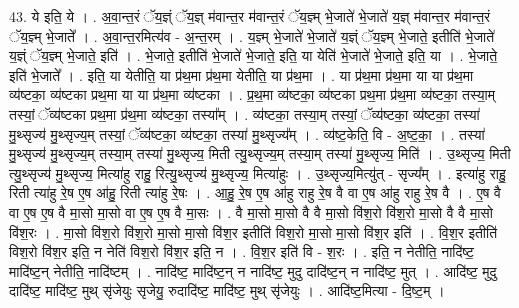 \documentclass[17pt]{extarticle}
\begin{document}
43. ये इति॒ ये । . अ॒वा॒न्त॒रं ॅय॒ज्ञ्ं ॅय॒ज्ञ् म॑वान्त॒र म॑वान्त॒रं ॅय॒ज्ञ्म् भे॒जाते॑ भे॒जाते॑ य॒ज्ञ् म॑वान्त॒र म॑वान्त॒रं ॅय॒ज्ञ्म् भे॒जाते᳚ । . अ॒वा॒न्त॒रमित्य॑व - अ॒न्त॒रम् । . य॒ज्ञ्म् भे॒जाते॑ भे॒जाते॑ य॒ज्ञ्ं ॅय॒ज्ञ्म् भे॒जाते॒ इतीति॑ भे॒जाते॑ य॒ज्ञ्ं ॅय॒ज्ञ्म् भे॒जाते॒ इति॑ । . भे॒जाते॒ इतीति॑ भे॒जाते॑ भे॒जाते॒ इति॒ या येति॑ भे॒जाते॑ भे॒जाते॒ इति॒ या । . भे॒जाते॒ इति॑ भे॒जाते᳚ । . इति॒ या येतीति॒ या प्र॑थ॒मा प्र॑थ॒मा येतीति॒ या प्र॑थ॒मा । . या प्र॑थ॒मा प्र॑थ॒मा या या प्र॑थ॒मा व्य॑ष्टका॒ व्य॑ष्टका प्रथ॒मा या या प्र॑थ॒मा व्य॑ष्टका । . प्र॒थ॒मा व्य॑ष्टका॒ व्य॑ष्टका प्रथ॒मा प्र॑थ॒मा व्य॑ष्टका॒ तस्या॒म् तस्यां॒ ॅव्य॑ष्टका प्रथ॒मा प्र॑थ॒मा व्य॑ष्टका॒ तस्या᳚म् । . व्य॑ष्टका॒ तस्या॒म् तस्यां॒ ॅव्य॑ष्टका॒ व्य॑ष्टका॒ तस्या॑ मु॒थ्सृज्य॑ मु॒थ्सृज्य॒म् तस्यां॒ ॅव्य॑ष्टका॒ व्य॑ष्टका॒ तस्या॑ मु॒थ्सृज्य᳚म् । . व्य॑ष्ट॒केति॒ वि - अ॒ष्ट॒का॒ । . तस्या॑ मु॒थ्सृज्य॑ मु॒थ्सृज्य॒म् तस्या॒म् तस्या॑ मु॒थ्सृज्य॒ मिती त्यु॒थ्सृज्य॒म् तस्या॒म् तस्या॑ मु॒थ्सृज्य॒ मिति॑ । . उ॒थ्सृज्य॒ मिती त्यु॒थ्सृज्य॑ मु॒थ्सृज्य॒ मित्या॑हु राहु॒ रित्यु॒थ्सृज्य॑ मु॒थ्सृज्य॒ मित्या॑हुः । . उ॒थ्सृज्य॒मित्यु॑त् - सृज्य᳚म् । . इत्या॑हु राहु॒ रिती त्या॑हु रे॒ष ए॒ष आ॑हु॒ रिती त्या॑हु रे॒षः । . आ॒हु॒ रे॒ष ए॒ष आ॑हु राहु रे॒ष वै वा ए॒ष आ॑हु राहु रे॒ष वै । . ए॒ष वै वा ए॒ष ए॒ष वै मा॒सो मा॒सो वा ए॒ष ए॒ष वै मा॒सः । . वै मा॒सो मा॒सो वै वै मा॒सो वि॑श॒रो वि॑श॒रो मा॒सो वै वै मा॒सो वि॑श॒रः । . मा॒सो वि॑श॒रो वि॑श॒रो मा॒सो मा॒सो वि॑श॒र इतीति॑ विश॒रो मा॒सो मा॒सो वि॑श॒र इति॑ । . वि॒श॒र इतीति॑ विश॒रो वि॑श॒र इति॒ न नेति॑ विश॒रो वि॑श॒र इति॒ न । . वि॒श॒र इति॑ वि - श॒रः । . इति॒ न नेतीति॒ नादि॑ष्ट॒ मादि॑ष्ट॒न् नेतीति॒ नादि॑ष्टम् । . नादि॑ष्ट॒ मादि॑ष्ट॒न् न नादि॑ष्ट॒ मुदु दादि॑ष्ट॒न् न नादि॑ष्ट॒ मुत् । . आदि॑ष्ट॒ मुदु दादि॑ष्ट॒ मादि॑ष्ट॒ मुथ् सृ॑जेयुः सृजेयु॒ रुदादि॑ष्ट॒ मादि॑ष्ट॒ मुथ् सृ॑जेयुः । . आदि॑ष्ट॒मित्या - दि॒ष्ट॒म् । \newline
\pagebreak
{}
\end{document}
